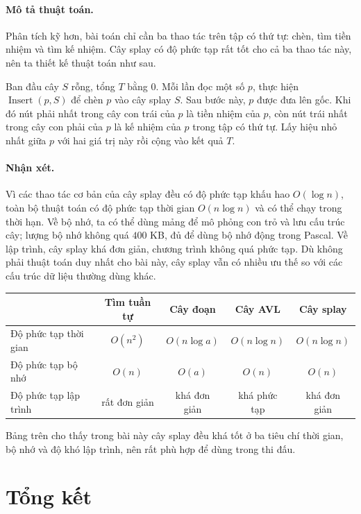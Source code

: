 \documentclass[11pt]{article}
\begin{document}
\paragraph{Mô tả thuật toán.}
Phân tích kỹ hơn, bài toán chỉ cần ba thao tác trên tập có thứ tự: chèn, tìm
tiền nhiệm và tìm kế nhiệm. Cây splay có độ phức tạp rất tốt cho cả ba thao
tác này, nên ta thiết kế thuật toán như sau.

Ban đầu cây $S$ rỗng, tổng $T$ bằng $0$. Mỗi lần đọc một số $p$, thực hiện
$\operatorname{Insert}(p,S)$ để chèn $p$ vào cây splay $S$. Sau bước này, $p$
được đưa lên gốc. Khi đó nút phải nhất trong cây con trái của $p$ là tiền
nhiệm của $p$, còn nút trái nhất trong cây con phải của $p$ là kế nhiệm của
$p$ trong tập có thứ tự. Lấy hiệu nhỏ nhất giữa $p$ với hai giá trị này rồi
cộng vào kết quả $T$.

\paragraph{Nhận xét.}
Vì các thao tác cơ bản của cây splay đều có độ phức tạp khấu hao
$O(\log n)$, toàn bộ thuật toán có độ phức tạp thời gian $O(n\log n)$ và có
thể chạy trong thời hạn. Về bộ nhớ, ta có thể dùng mảng để mô phỏng con trỏ
và lưu cấu trúc cây; lượng bộ nhớ không quá $400$ KB, đủ để dùng bộ nhớ động
trong Pascal. Về lập trình, cây splay khá đơn giản, chương trình không quá
phức tạp. Dù không phải thuật toán duy nhất cho bài này, cây splay vẫn có
nhiều ưu thế so với các cấu trúc dữ liệu thường dùng khác.

\begin{center}
\begin{tabular}{lcccc}
\hline
 & Tìm tuần tự & Cây đoạn & Cây AVL & Cây splay \\
\hline
Độ phức tạp thời gian & $O(n^2)$ & $O(n\log a)$ & $O(n\log n)$ & $O(n\log n)$ \\
Độ phức tạp bộ nhớ & $O(n)$ & $O(a)$ & $O(n)$ & $O(n)$ \\
Độ phức tạp lập trình & rất đơn giản & khá đơn giản & khá phức tạp & khá đơn giản \\
\hline
\end{tabular}
\end{center}

Bảng trên cho thấy trong bài này cây splay đều khá tốt ở ba tiêu chí thời
gian, bộ nhớ và độ khó lập trình, nên rất phù hợp để dùng trong thi đấu.

\section{Tổng kết}
\end{document}

